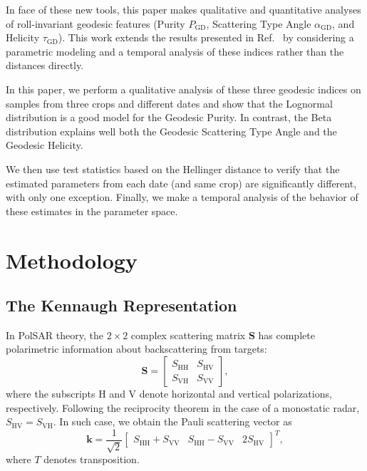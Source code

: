 \documentclass[journal]{IEEEtran}
\begin{document}
	In face of these new tools, this paper makes qualitative and quantitative analyses of roll-invariant geodesic features (Purity $P_{\text{GD}}$, Scattering Type Angle $\alpha_{\text{GD}}$, and Helicity $\tau_{\text{GD}}$).
	This work extends the results presented in Ref.~\cite{StatisticalPropertiesofGeodesicDistancesBetweenSamplesandElementaryScatterersinPolSARImagery2019} by considering a parametric modeling and a temporal analysis of these indices rather than the distances directly.%
	
	In this paper, we perform a qualitative analysis of these three geodesic indices on samples from three crops and different dates and show that the Lognormal distribution is a good model for the Geodesic Purity. In contrast, the Beta distribution explains well both the Geodesic Scattering Type Angle and the Geodesic Helicity.%
	
	We then use test statistics based on the Hellinger distance to verify that the estimated parameters from each date (and same crop) are significantly different, with only one exception.
	Finally, we make a temporal analysis of the behavior of these estimates in the parameter space.
	
	\section{Methodology}
	
	\subsection{The Kennaugh Representation}
	
	In PolSAR theory, the $2 \times 2$ complex scattering matrix $\bm S$ has
	complete polarimetric information about backscattering
	from targets:
	$$
	\bm S = \begin{bmatrix}
	S_{\text{HH}} &S_{\text{HV}}\\
	S_{\text{VH}} &S_{\text{VV}}
	\end{bmatrix},
	$$
	where the subscripts $\text{H}$ and $\text{V}$ denote horizontal and vertical
	polarizations, respectively. 
	Following the reciprocity theorem
	in the case of a monostatic radar, 
	$S_{\text{HV}}=S_{\text{VH}}$.
	In such case, we obtain the Pauli scattering vector as
	$$
	\bm k = \frac1{\sqrt{2}}
	\begin{bmatrix}
	S_{\text{HH}} + S_{\text{VV}} 
	& S_{\text{HH}} - S_{\text{VV}} 
	& 2S_{\text{HV}}
	\end{bmatrix}^T,
	$$
	where $T$ denotes transposition.
	
\end{document}
